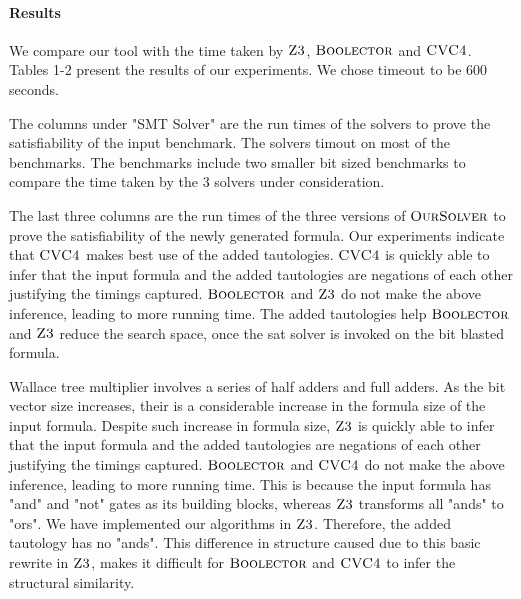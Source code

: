 \paragraph{\bf Results}
%
We compare our tool with the time taken by $\textsc{Z3}$, $\textsc{Boolector}$ and $\textsc{CVC4}$. Tables 1-2 present the results of our experiments. We chose timeout to be 600 seconds.
%



The columns under "SMT Solver" are the run times of the solvers to prove the satisfiability of the input benchmark. The solvers timout on most of the benchmarks. The benchmarks include two smaller bit sized benchmarks to compare the time taken by the 3 solvers under consideration.

The last three columns are the run times of the three versions of $\textsc{OurSolver}$ to prove the satisfiability of the newly generated formula.
%
Our experiments indicate that $\textsc{CVC4}$ makes best use of the added tautologies. $\textsc{CVC4}$ is quickly able to infer that the input formula and the added tautologies are negations of each other justifying the timings captured. 
$\textsc{Boolector}$ and $\textsc{Z3}$ do not make the above inference, leading to more running time. The added tautologies help $\textsc{Boolector}$ and $\textsc{Z3}$ reduce the search space, once the sat solver is invoked on the bit blasted formula.




Wallace tree multiplier involves a series of half adders and full adders. As the bit vector size increases, their is a considerable increase in the formula size of the input formula. Despite such increase in formula size, $\textsc{Z3}$ is quickly able to infer that the input formula and the added tautologies are negations of each other justifying the timings captured. $\textsc{Boolector}$ and $\textsc{CVC4}$ do not make the above inference, leading to more running time. This is because the input formula has "and" and "not" gates as its building blocks, whereas $\textsc{Z3}$ transforms all "ands" to "ors". We have implemented our algorithms in $\textsc{Z3}$. Therefore, the added tautology has no "ands". This difference in structure caused due to this basic rewrite in $\textsc{Z3}$, makes it difficult for $\textsc{Boolector}$ and $\textsc{CVC4}$ to infer the structural similarity. 

